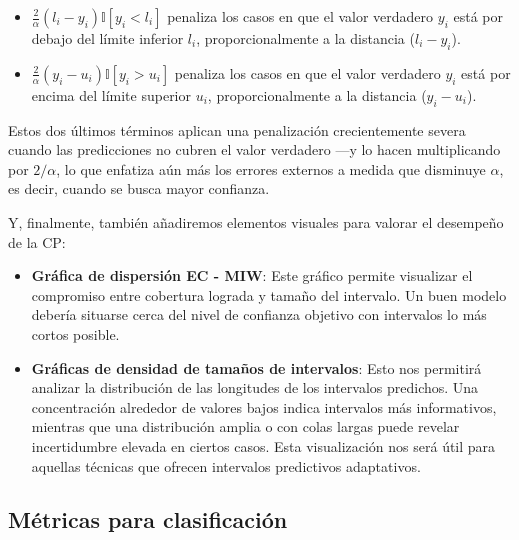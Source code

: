 \begin{itemize}
    \begin{itemize}
        \item $\frac{2}{\alpha} \left( l_i-y_i \right) \mathbb{I}\left[ y_i<l_i \right]$ penaliza los casos en 
        que el valor verdadero $y_i$ está por debajo del límite inferior $l_i$, proporcionalmente a la 
        distancia ($l_i-y_i$).
        \item $\frac{2}{\alpha}  \left( y_i-u_i \right) \mathbb{I}\left[ y_i>u_i \right]$ penaliza los casos en 
        que el valor verdadero $y_i$ está por encima del límite superior $u_i$, proporcionalmente a la 
        distancia ($y_i-u_i$).
    \end{itemize}

    Estos dos últimos términos aplican una penalización crecientemente severa cuando las predicciones no 
    cubren el valor verdadero ---y lo hacen multiplicando por $2/\alpha$, lo que enfatiza aún más los errores 
    externos a medida que disminuye $\alpha$, es decir, cuando se busca mayor confianza.

\end{itemize}

Y, finalmente, también añadiremos elementos visuales para valorar el desempeño de la CP:

\begin{itemize}

    \item \textbf{Gráfica de dispersión EC - MIW}: Este gráfico permite visualizar el compromiso entre 
    cobertura lograda y tamaño del intervalo. Un buen modelo debería situarse cerca del nivel de confianza 
    objetivo con intervalos lo más cortos posible.
    
    \item \textbf{Gráficas de densidad de tamaños de intervalos}: Esto nos permitirá analizar la distribución 
    de las longitudes de los intervalos predichos. Una concentración alrededor de valores bajos indica 
    intervalos más informativos, mientras que una distribución amplia o con colas largas puede revelar
    incertidumbre elevada en ciertos casos. Esta visualización nos será útil para aquellas técnicas que 
    ofrecen intervalos predictivos adaptativos. 

\end{itemize}


\subsection{Métricas para clasificación}

